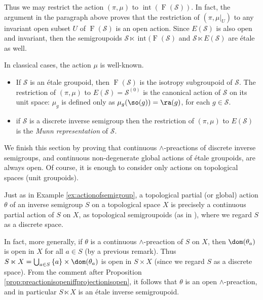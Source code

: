 \begin{example}
    Thus we may restrict the action $(\pi,\mu)$ to $\operatorname{int}(\operatorname{F}(\mathcal{S}))$. In fact, the argument in the paragraph above proves that the restriction of $(\pi,\mu|_U)$ to any invariant open subset $U$ of $\operatorname{F}(\mathcal{S})$ is an open action. Since $E(\mathcal{S})$ is also open and invariant, then the semigroupoids $\mathcal{S}\ltimes\operatorname{int}(\operatorname{F}(\mathcal{S})$ and $\mathcal{S}\ltimes E(\mathcal{S})$ are étale as well.
    
    In classical cases, the action $\mu$ is well-known.
    
    \begin{itemize}
        \item If $\mathcal{S}$ is an étale groupoid, then $\operatorname{F}(\mathcal{S})$ is the isotropy subgroupoid of $\mathcal{S}$. The restriction of $(\pi,\mu)$ to $E(\mathcal{S})=\mathcal{S}^{(0)}$ is the canonical action of $\mathcal{S}$ on its unit space: $\mu_g$ is defined only as $\mu_g(\so(g))=\ra(g)$, for each $g\in\mathcal{S}$.
        \item if $\mathcal{S}$ is a discrete inverse semigroup then the restriction of $(\pi,\mu)$ to $E(\mathcal{S})$ is the \emph{Munn representation} of $\mathcal{S}$.
    \end{itemize}
\end{example}

We finish this section by proving that continuous $\land$-preactions of discrete inverse semigroups, and continuous non-degenerate global actions of étale groupoids, are always open. Of course, it is enough to consider only actions on topological spaces (unit groupoids).

\begin{example}\label{ex:semidirectproductofactionisetale}
Just as in Example \ref{ex:actionofsemigroup}, a topological partial (or global) action $\theta$ of an inverse semigroup $S$ on a topological space $X$ is precisely a continuous partial action of $S$ on $X$, as topological semigroupoids (as in \cite[Definition 2.3]{arxiv1804.00396}), where we regard $S$ as a discrete space.

In fact, more generally, if $\theta$ is a continuous $\land$-preaction of $S$ on $X$, then $\dom(\theta_a)$ is open in $X$ for all $a\in S$ (by a previous remark). Thus $S\ltimes X=\bigcup_{a\in S}\left\{a\right\}\times\dom(\theta_a)$ is open in $S\times X$ (since we regard $S$ as a discrete space). From the comment after Proposition \ref{prop:preactionisopeniffprojectionisopen}, it follows that $\theta$ is an open $\land$-preaction, and in particular $S\ltimes X$ is an étale inverse semigroupoid.
\end{example}

